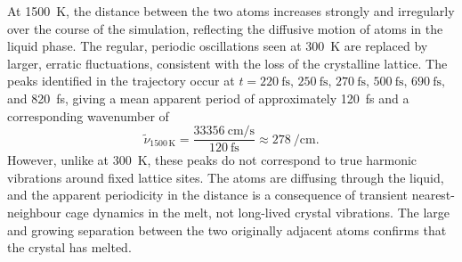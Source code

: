 \documentclass[a4paper,12pt]{scrartcl}
\begin{document}
At \SI{1500}{\kelvin}, the distance between the two atoms increases strongly and irregularly over the course of the simulation, reflecting the diffusive motion of atoms in the liquid phase. The regular, periodic oscillations seen at \SI{300}{\kelvin} are replaced by larger, erratic fluctuations, consistent with the loss of the crystalline lattice. The peaks identified in the trajectory occur at $t = \SI{220}{\femto\second},\, \SI{250}{\femto\second},\, \SI{270}{\femto\second},\, \SI{500}{\femto\second},\, \SI{690}{\femto\second},$ and \SI{820}{\femto\second}, giving a mean apparent period of approximately \SI{120}{\femto\second} and a corresponding wavenumber of
\begin{equation}
    \tilde{\nu}_{1500\,\mathrm{K}} = \frac{\SI{33356}{\centi\metre\per\second}}{\SI{120}{\femto\second}} \approx \SI{278}{\per\centi\metre}.
\end{equation}
However, unlike at \SI{300}{\kelvin}, these peaks do not correspond to true harmonic vibrations around fixed lattice sites. The atoms are diffusing through the liquid, and the apparent periodicity in the distance is a consequence of transient nearest-neighbour cage dynamics in the melt, not long-lived crystal vibrations. The large and growing separation between the two originally adjacent atoms confirms that the crystal has melted.
\end{document}

